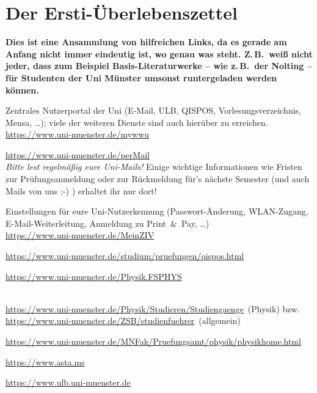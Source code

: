 \section[Ersti-Überlebenszettel (wichtige Links)]{Der Ersti-Überlebenszettel}
\label{dpü}
\vspace{-2ex}
\textbf{Dies ist eine Ansammlung von hilfreichen Links, da es gerade am Anfang nicht immer eindeutig ist, wo genau was steht.
	Z.\,B.\ weiß nicht jeder, dass zum Beispiel Basis-Literaturwerke -- wie z.\,B.\ der Nolting -- für Studenten der Uni Münster umsonst runtergeladen werden können.}
\begin{description}[parsep=1ex, leftmargin=0pt, itemsep=0.2ex]
	\centering
	\item[myWWU-Portal:] Zentrales Nutzerportal der Uni (E-Mail, ULB, QISPOS, Vorlesungsverzeichnis, Mensa, \dots); viele der weiteren Dienste sind auch hierüber zu erreichen.\\
	\url{https://www.uni-muenster.de/mywwu}
	\item[Uni-Mailsystem (perMail):] \url{https://www.uni-muenster.de/perMail}\\
	\emph{Bitte lest regelmäßig eure Uni-Mails!}
	Einige wichtige Informationen wie Fristen zur Prüfungsanmeldung oder zur Rückmeldung für's nächste Semester (und auch Mails von uns ;-) ) erhaltet ihr nur dort!
	\item[MeinZIV:] Einstellungen für eure Uni-Nutzerkennung (Passwort-Änderung, WLAN-Zugang, E-Mail-Weiterleitung, Anmeldung zu Print~\&~Pay, \dots)\\	
	\url{https://www.uni-muenster.de/MeinZIV}
	\item[QISPOS:] \url{https://www.uni-muenster.de/studium/pruefungen/qispos.html}
	\item[Fachschaft Physik:] \url{https://www.uni-muenster.de/Physik.FSPHYS}
	\item[Prüfungsordnungen/Studiengangs-Infos:]~\\
	\url{https://www.uni-muenster.de/Physik/Studieren/Studiengaenge}~(Physik) bzw.\\
	\url{https://www.uni-muenster.de/ZSB/studienfuehrer}~(allgemein)
	\item[Prüfungsamt Physik:] \url{https://www.uni-muenster.de/MNFak/Pruefungsamt/physik/physikhome.html}
	\item[AStA Uni Münster:] \url{https://www.asta.ms}
	\item[Universitäts- und Landesbibliothek (ULB):] \url{https://www.ulb.uni-muenster.de}

\end{description}
